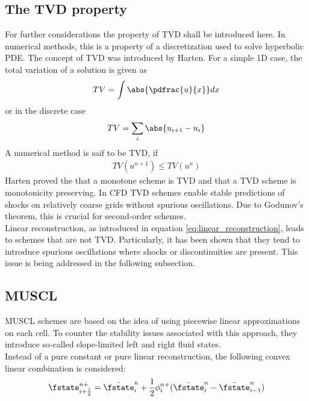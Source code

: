 \documentclass[../main.tex]{subfiles}
\begin{document}
\subsection{The \acf{TVD} property}\label{sec:TVD}
For further considerations the property of \acf{TVD} shall be introduced here. In numerical methods, this is a property of a discretization used to solve hyperbolic \ac{PDE}. The concept of \ac{TVD} was introduced by Harten\cite{Harten1983}.
For a simple 1D case, the total variation of a solution is given as
\begin{align}
TV=\int\abs{\pdfrac{u}{x}} dx
\end{align}
or in the discrete case
\begin{align}
TV=\sum_i \abs{u_{i+1}-u_i}
\end{align}
A numerical method is saif to be \ac{TVD}, if
\begin{align}
TV(u^{n+1})\leq TV(u^n)
\end{align}
Harten proved the that a monotone scheme is \ac{TVD} and that a \ac{TVD} scheme is monotonicity preserving. In \ac{CFD} \ac{TVD} schemes enable stable predictions of shocks on relatively coarse grids without spurious oscillations. Due to Godunov's theorem, this is crucial for second-order schemes.\\


Linear reconstruction, as introduced in equation \eqref{eq:linear_reconstruction}, leads to schemes that are not \ac{TVD}. Particularly, it has been shown that they tend to introduce spurious oscillations where shocks or discontinuities are present. This issue is being addressed in the following subsection.



\subsection{\acf{MUSCL}}\label{sec:muscl}
\acf{MUSCL} schemes are based on the idea of using piecewise linear approximations on each cell. To counter the stability issues associated with this approach, they introduce so-called slope-limited left and right fluid states.\\
Instead of a pure constant or pure linear reconstruction, the following convex linear combination is considered:
\begin{align}
\fstate_{i+\frac{1}{2}}^{n+} = \bar{\fstate}_i^n +\frac{1}{2}\phi_i^{n+}(\bar{\fstate}_i^n-\bar{\fstate}_{i-1}^n)
\end{align}
\end{document}
